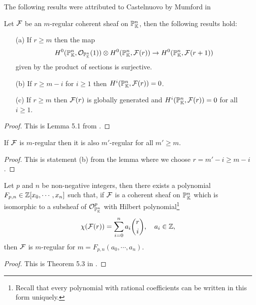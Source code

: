The following results were attributed to Castelnuovo by Mumford in \cite{mumford1966lectures}
\begin{lemma}[Castelnuovo]\label{CastelnuovoLemma}
Let $\mathcal{F}$ be an $m$-regular coherent sheaf on $\mathbb{P}^n_{\mathbb{K}}$, then the following results hold:
\begin{enumerate}
\item[\rm(a)] If $r\geq m$ then the map
\[H^0(\mathbb{P}^n_{\mathbb{K}},\mathcal{O}_{\mathbb{P}^n_{\mathbb{K}}}(1))\otimes H^0(\mathbb{P}^n_{\mathbb{K}},\mathcal{F}(r))\to H^0(\mathbb{P}^n_{\mathbb{K}},\mathcal{F}(r+1))\]
given by the product of sections is surjective.
\item[\rm(b)] If $r\geq m-i$ for $i\geq 1$ then $H^i(\mathbb{P}^n_{\mathbb{K}},\mathcal{F}(r))=0$.
\item[\rm(c)] If $r\geq m$ then $\mathcal{F}(r)$ is globally generated and $H^i(\mathbb{P}^n_{\mathbb{K}},\mathcal{F}(r))=0$ for all $i\geq 1$.
\end{enumerate}
\end{lemma}
\begin{proof}
This is Lemma 5.1 from \cite{FGAEXPLAINED}.
\end{proof}

\begin{corollary}\label{RegularityUnboundedAbove}
If $\mathcal{F}$ is $m$-regular then it is also $m'$-regular for all $m'\geq m$.
\end{corollary}
\begin{proof}
This is statement (b) from the lemma where we choose $r=m'-i\geq m-i$.
\end{proof}

\begin{theorem}[Mumford]\label{MumfordTheorem}
Let $p$ and $n$ be non-negative integers, then there exists a polynomial $F_{p,n}\in\mathbb{Z}[x_0,\cdots, x_n]$ such that, if $\mathcal{F}$ is a coherent sheaf on $\mathbb{P}^n_{\mathbb{K}}$ which is isomorphic to a subsheaf of $\mathcal{O}^p_{\mathbb{P}^n_{\mathbb{K}}}$ with Hilbert polynomial\footnote{Recall that every polynomial with rational coefficients can be written in this form uniquely.}
\[\chi(\mathcal{F}(r))=\sum_{i=0}^na_i\binom ri,\quad a_i\in\mathbb{Z},\]
then $\mathcal{F}$ is $m$-regular for $m=F_{p,n}(a_0,\cdots, a_n)$.
\end{theorem}
\begin{proof}
This is Theorem 5.3 in \cite{FGAEXPLAINED}.
\end{proof}

